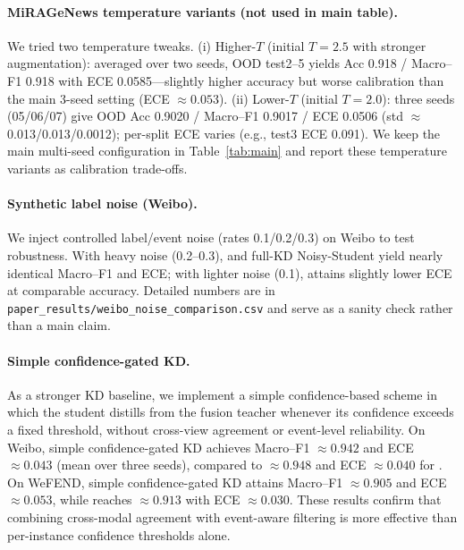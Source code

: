 \paragraph{MiRAGeNews temperature variants (not used in main table).} We tried two temperature tweaks. (i) Higher-$T$ (initial $T{=}2.5$ with stronger augmentation): averaged over two seeds, OOD test2--5 yields Acc 0.918 / Macro--F1 0.918 with ECE 0.0585—slightly higher accuracy but worse calibration than the main 3-seed setting (ECE $\approx 0.053$). (ii) Lower-$T$ (initial $T{=}2.0$): three seeds (05/06/07) give OOD Acc 0.9020 / Macro--F1 0.9017 / ECE 0.0506 (std $\approx$ 0.013/0.013/0.0012); per-split ECE varies (e.g., test3 ECE 0.091). We keep the main multi-seed configuration in Table~\ref{tab:main} and report these temperature variants as calibration trade-offs.

\paragraph{Synthetic label noise (Weibo).} We inject controlled label/event noise (rates 0.1/0.2/0.3) on Weibo to test robustness. With heavy noise (0.2--0.3), \modelname{} and full-KD Noisy-Student yield nearly identical Macro--F1 and ECE; with lighter noise (0.1), \modelname{} attains slightly lower ECE at comparable accuracy. Detailed numbers are in \texttt{paper\_results/weibo\_noise\_comparison.csv} and serve as a sanity check rather than a main claim.

\paragraph{Simple confidence-gated KD.} As a stronger KD baseline, we implement a simple confidence-based scheme in which the student distills from the fusion teacher whenever its confidence exceeds a fixed threshold, without cross-view agreement or event-level reliability. On Weibo, simple confidence-gated KD achieves Macro--F1 $\approx 0.942$ and ECE $\approx 0.043$ (mean over three seeds), compared to $\approx 0.948$ and ECE $\approx 0.040$ for \modelname{}. On WeFEND, simple confidence-gated KD attains Macro--F1 $\approx 0.905$ and ECE $\approx 0.053$, while \modelname{} reaches $\approx 0.913$ with ECE $\approx 0.030$. These results confirm that combining cross-modal agreement with event-aware filtering is more effective than per-instance confidence thresholds alone.

